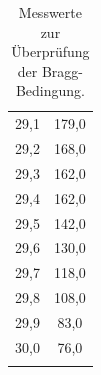 \begin{table} [H]
\begin{minipage}{0.5\textwidth}
\begin{tabular}{c|c}
      29,1	 & 179,0 \\
      29,2	 & 168,0 \\
      29,3	 & 162,0 \\
      29,4	 & 162,0 \\
      29,5	 & 142,0 \\
      29,6	 & 130,0 \\
      29,7	 & 118,0 \\
      29,8	 & 108,0 \\
      29,9	 & 83,0 \\
      30,0	 & 76,0 \\
        &
    \end{tabular}
  \end{minipage}
    \caption{Messwerte zur Überprüfung der Bragg-Bedingung.}
  \end{table}

